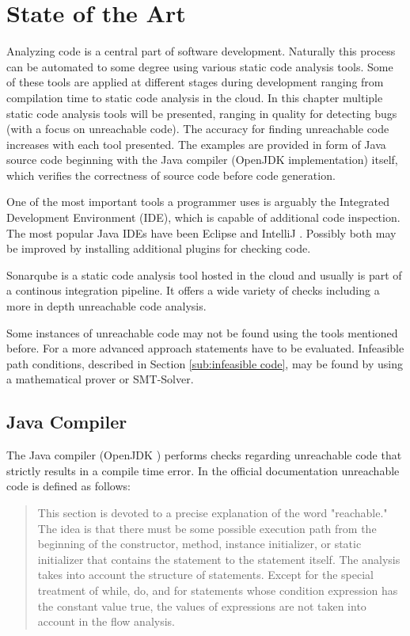 
\chapter{State of the Art}
\label{cha:state of the art}

Analyzing code is a central part of software development. Naturally this process can be automated to some degree using various static code analysis tools. 
Some of these tools are applied at different stages during development ranging from compilation time to static code analysis in the cloud.
In this chapter multiple static code analysis tools will be presented, ranging in quality for detecting bugs (with a focus on unreachable code).
The accuracy for finding unreachable code increases with each tool presented. 
The examples are provided in form of Java source code beginning with the Java compiler (OpenJDK \cite{OpenJDK} implementation) itself, which verifies the correctness of source code before code generation. 


One of the most important tools a programmer uses is arguably the Integrated Development Environment (IDE), which is capable of additional code inspection. 
The most popular Java IDEs have been Eclipse \cite{incCommunityOpenInnovation} and IntelliJ \cite{IntelliJIDEACapable}. 
Possibly both may be improved by installing additional plugins for checking code.


Sonarqube \cite{sonarqube} is a static code analysis tool hosted in the cloud and usually is part of a continous integration pipeline. It offers a wide variety of checks including a more in depth unreachable code analysis.


Some instances of unreachable code may not be found using the tools mentioned before. For a more advanced approach statements have to be evaluated. Infeasible path conditions, described in Section \ref{sub:infeasible code}, may be found by using a mathematical prover or SMT-Solver.
\clearpage
\pagebreak
\section{Java Compiler}
\label{sec:Java compiler}

The Java compiler (OpenJDK \cite{OpenJDK}) performs checks regarding unreachable code that strictly results in a compile time error. 
In the official documentation \cite{Chapter14Blocks} unreachable code is defined as follows:
\begin{quote}
This section is devoted to a precise explanation of the word "reachable." 
The idea is that there must be some possible execution path from the beginning of the constructor, method, instance initializer, or static initializer that contains the statement to the statement itself. The analysis takes into account the structure of statements. Except for the special treatment of while, do, and for statements whose condition expression has the constant value true, the values of expressions are not taken into account in the flow analysis.
\label{quote:Java unreachable definition}
\end{quote}


